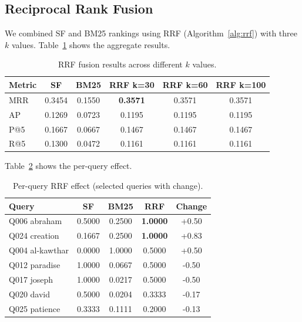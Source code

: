 \documentclass[conference]{IEEEtran}
\begin{document}
\subsection{Reciprocal Rank Fusion}

We combined SF and BM25 rankings using RRF (Algorithm~\ref{alg:rrf})
with three $k$ values. Table~\ref{tab:rrf} shows the aggregate results.

\begin{table}[t]
  \centering
  \caption{RRF fusion results across different $k$ values.}
  \label{tab:rrf}
  \footnotesize
  \begin{tabular}{lccccc}
    \toprule
    \textbf{Metric} &
    \textbf{\textcolor{sfblue}{SF}} &
    \textbf{BM25} &
    \textbf{\textcolor{rrfgreen}{RRF k=30}} &
    \textbf{\textcolor{rrfgreen}{RRF k=60}} &
    \textbf{\textcolor{rrfgreen}{RRF k=100}} \\
    \midrule
    MRR & 0.3454 & 0.1550 & \textbf{0.3571} & 0.3571 & 0.3571 \\
    AP  & 0.1269 & 0.0723 & 0.1195 & 0.1195 & 0.1195 \\
    P@5 & 0.1667 & 0.0667 & 0.1467 & 0.1467 & 0.1467 \\
    R@5 & 0.1300 & 0.0472 & 0.1161 & 0.1161 & 0.1161 \\
    \bottomrule
  \end{tabular}
\end{table}

Table~\ref{tab:rrf_perquery} shows the per-query effect.

\begin{table}[t]
  \centering
  \caption{Per-query RRF effect (selected queries with change).}
  \label{tab:rrf_perquery}
  \footnotesize
  \begin{tabular}{lcccc}
    \toprule
    \textbf{Query} &
    \textbf{\textcolor{sfblue}{SF}} &
    \textbf{BM25} &
    \textbf{\textcolor{rrfgreen}{RRF}} &
    \textbf{Change} \\
    \midrule
    Q006 abraham & 0.5000 & 0.2500 & \textbf{1.0000} & +0.50 \\
    Q024 creation & 0.1667 & 0.2500 & \textbf{1.0000} & +0.83 \\
    Q004 al-kawthar & 0.0000 & 1.0000 & 0.5000 & +0.50 \\
    Q012 paradise & 1.0000 & 0.0667 & 0.5000 & -0.50 \\
    Q017 joseph & 1.0000 & 0.0217 & 0.5000 & -0.50 \\
    Q020 david & 0.5000 & 0.0204 & 0.3333 & -0.17 \\
    Q025 patience & 0.3333 & 0.1111 & 0.2000 & -0.13 \\
    \bottomrule
  \end{tabular}
\end{table}
\end{document}
